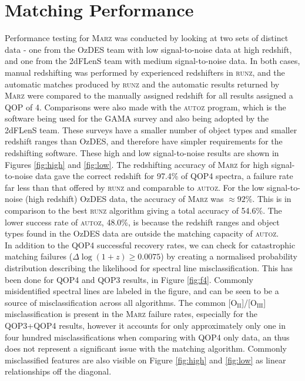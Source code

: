 \documentclass[iop]{emulateapj}
\newcommand{\runz}{\textsc{runz}}
\newcommand{\autoz}{\textsc{autoz}}
\newcommand{\marz}{\textsc{Marz}}
\begin{document}
\section{Matching Performance}

Performance testing for \marz{} was conducted by looking at two sets of distinct data - one from the OzDES team with low signal-to-noise data at high redshift, and one from the 2dFLenS team with medium signal-to-noise data. In both cases, manual redshifting was performed by experienced redshifters in \runz{}, and the automatic matches produced by \runz{} and the automatic results returned by \marz{} were compared to the manually assigned redshift for all results assigned a QOP of 4. Comparisons were also made with the \autoz{} program, which is the software being used for the GAMA survey and also being adopted by the 2dFLenS team. These surveys have a smaller number of object types and smaller redshift ranges than OzDES, and therefore have simpler requirements for the redshifting software. These high and low signal-to-noise results are shown in Figures \ref{fig:high} and \ref{fig:low}. The redshifting accuracy of \marz{} for high signal-to-noise data gave the correct redshift for 97.4\% of QOP4 spectra, a failure rate far less than that offered by \runz{} and comparable to \autoz{}. For the low signal-to-noise (high redshift) OzDES data, the accuracy of \marz{} was $\approx 92$\%. This is in comparison to the best \runz{} algorithm giving a total accuracy of 54.6\%. The lower success rate of \autoz, 48.0\%, is because the redshift ranges and object types found in the OzDES data are outside the matching capacity of \autoz{}.\\

In addition to the QOP4 successful recovery rates, we can check for catastrophic matching failures ($\Delta \log(1+z) \geq 0.0075$) by creating a normalised probability distribution describing the likelihood for spectral line misclassification. This has been done for QOP4 and QOP3 results, in Figure \ref{fig:f4}. Commonly misidentified spectral lines are labeled in the figure, and can be seen to be a source of misclassification across all algorithms. The common [O$_{\mathrm{II}}$]/[O$_{\mathrm{III}}$] misclassification is present in the \marz{} failure rates, especially for the QOP3+QOP4 results, however it accounts for only approximately only one in four hundred misclassifications when comparing with QOP4 only data, an thus does not represent a significant issue with the matching algorithm. Commonly misclassified features are also visible on Figure \ref{fig:high} and \ref{fig:low} as linear relationships off the diagonal.\\
\end{document}
